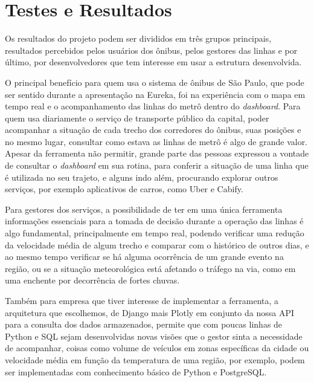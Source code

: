 \chapter{Testes e Resultados}
\label{Cap:Resultados}
\newcommand{\EscalaAlgumaCoisa}{0.6}
\indent
\par Os resultados do projeto podem ser divididos em três grupos principais, resultados percebidos pelos usuários dos ônibus, pelos gestores das linhas e por último, por desenvolvedores que tem interesse em usar a estrutura desenvolvida.
\indent
\par O principal benefício para quem usa o sistema de ônibus de São Paulo, que pode ser sentido durante a apresentação na Eureka, foi na experiência com o mapa em tempo real e o acompanhamento das linhas do metrô dentro do \textit{dashboard}. Para quem usa diariamente o serviço de transporte público da capital, poder acompanhar a situação de cada trecho dos corredores do ônibus, suas posições e no mesmo lugar, consultar como estava as linhas de metrô é algo de grande valor. Apesar da ferramenta não permitir, grande parte das pessoas expressou a vontade de consultar o \textit{dashboard} em sua rotina, para conferir a situação de uma linha que é utilizada no seu trajeto, e alguns indo além, procurando explorar outros serviços, por exemplo aplicativos de carros, como Uber e Cabify.
\indent
\par Para gestores dos serviços, a possibilidade de ter em uma única ferramenta informações essenciais para a tomada de decisão durante a operação das linhas é algo fundamental, principalmente em tempo real, podendo verificar uma redução da velocidade média de algum trecho e comparar com o histórico de outros dias, e ao mesmo tempo verificar se há alguma ocorrência de um grande evento na região, ou se a situação meteorológica está afetando o tráfego na via, como em uma enchente por decorrência de fortes chuvas.
\indent
\par Também para empresa que tiver interesse de implementar a ferramenta, a arquitetura que escolhemos, de Django mais Plotly em conjunto da nossa API para a consulta dos dados armazenados, permite que com poucas linhas de Python e SQL sejam desenvolvidas novas visões que o gestor sinta a necessidade de acompanhar, coisas como volume de veículos em zonas específicas da cidade ou velocidade média em função da temperatura de uma região, por exemplo, podem ser implementadas com conhecimento básico de Python e PostgreSQL.
\indent

